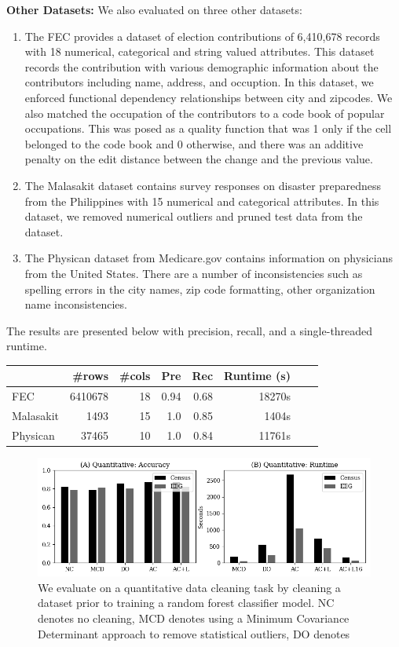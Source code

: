 \vspace{0.5em}\noindent\textbf{Other Datasets: } We also evaluated \sys on three  other datasets:
\begin{enumerate}
    \item The FEC provides a dataset of election contributions of 6,410,678 records with 18 numerical, categorical and string valued attributes. This dataset records the contribution with various demographic information about the contributors including name, address, and occuption.
    In this dataset, we enforced functional dependency relationships between city and zipcodes. We also matched the occupation of the contributors to a code book of popular occupations. This was posed as a quality function that was 1 only if the cell belonged to the code book and 0 otherwise, and there was an additive penalty on the edit distance between the change and the previous value.   
    \item The Malasakit dataset contains survey responses on disaster preparedness from the Philippines with 15 numerical and categorical attributes. In this dataset, we removed numerical outliers and pruned test data from the dataset. 
    \item The Physican dataset from  Medicare.gov contains information on physicians from the United States. There are a number of inconsistencies such as  spelling errors in the city names, zip code formatting, other organization name inconsistencies.
\end{enumerate}

The results are presented below with precision, recall, and a single-threaded runtime.
\begin{table}[ht]
\footnotesize
\centering
\begin{tabular}{|l|r|r|r|r|r|r|r|}
\hline
 & \#rows & \#cols & Pre & Rec & Runtime (s) \\
\hline
\hline
FEC	&6410678&18&0.94&	0.68&	18270s\\
\hline
Malasakit &1493& 15& 1.0 & 0.85& 1404s\\
\hline
Physican	&37465&10&1.0&0.84& 11761s\\
\hline
\end{tabular}
\end{table}

\begin{figure}
    \centering
    \includegraphics[width=\columnwidth]{exp/exp2.png}
    \caption{We evaluate \sys on a quantitative data cleaning task by cleaning a dataset prior to training a random forest classifier model. NC denotes no cleaning, MCD denotes using a Minimum Covariance Determinant approach to remove statistical outliers, DO denotes \label{exp1a}}
\end{figure}

